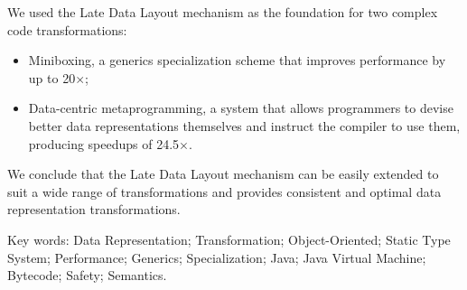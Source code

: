 \vspace{1em}

We used the Late Data Layout mechanism as the foundation for two complex code transformations:

\begin{itemize}
  \item Miniboxing, a generics specialization scheme that improves performance by up to 20$\times$;
  \item Data-centric metaprogramming, a system that allows programmers to devise better data representations themselves and instruct the compiler to use them, producing speedups of 24.5$\times$.
\end{itemize}

We conclude that the Late Data Layout mechanism can be easily extended to suit a wide range of transformations and provides consistent and optimal data representation transformations.

\vskip0.5cm
Key words:
Data Representation; Transformation; Object-Oriented; Static Type System; Performance; Generics; Specialization; Java; Java Virtual Machine; Bytecode; Safety; Semantics.









